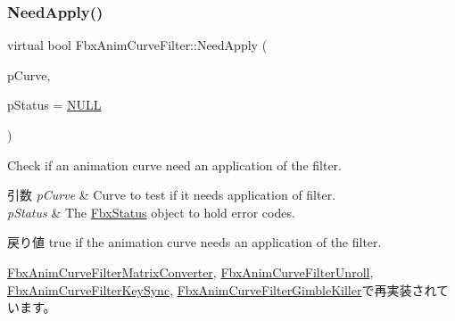 \mbox{\label{class_fbx_anim_curve_filter_af768a9c47e4f5a5fff47a8ec781e6b4c}} 
\subsubsection{\texorpdfstring{Need\+Apply()}{NeedApply()}\hspace{0.1cm}{\footnotesize\ttfamily [5/5]}}
{\footnotesize\ttfamily virtual bool Fbx\+Anim\+Curve\+Filter\+::\+Need\+Apply (\begin{DoxyParamCaption}\item[{\hyperlink{class_fbx_anim_curve}{Fbx\+Anim\+Curve} \&}]{p\+Curve,  }\item[{\hyperlink{class_fbx_status}{Fbx\+Status} $\ast$}]{p\+Status = {\ttfamily \hyperlink{fbxarch_8h_a070d2ce7b6bb7e5c05602aa8c308d0c4}{N\+U\+LL}} }\end{DoxyParamCaption})\hspace{0.3cm}{\ttfamily [virtual]}}

Check if an animation curve need an application of the filter. 
\begin{DoxyParams}{引数}
{\em p\+Curve} & Curve to test if it needs application of filter. \\
\hline
{\em p\+Status} & The \hyperlink{class_fbx_status}{Fbx\+Status} object to hold error codes. \\
\hline
\end{DoxyParams}
\begin{DoxyReturn}{戻り値}
{\ttfamily true} if the animation curve needs an application of the filter. 
\end{DoxyReturn}


\hyperlink{class_fbx_anim_curve_filter_matrix_converter_aa7105a07dbaf0d9598fa930ff2b3141d}{Fbx\+Anim\+Curve\+Filter\+Matrix\+Converter}, \hyperlink{class_fbx_anim_curve_filter_unroll_adbe1626e507eb312b994b38403a11a19}{Fbx\+Anim\+Curve\+Filter\+Unroll}, \hyperlink{class_fbx_anim_curve_filter_key_sync_a5f255ee33fe2ecad8c61562931840c01}{Fbx\+Anim\+Curve\+Filter\+Key\+Sync}, \hyperlink{class_fbx_anim_curve_filter_gimble_killer_a136dadcee53ebed6b5afc6abddfcf402}{Fbx\+Anim\+Curve\+Filter\+Gimble\+Killer}で再実装されています。

\mbox{\label{class_fbx_anim_curve_filter_a57fb35baaaa85adb08946383cf40e811}} 
